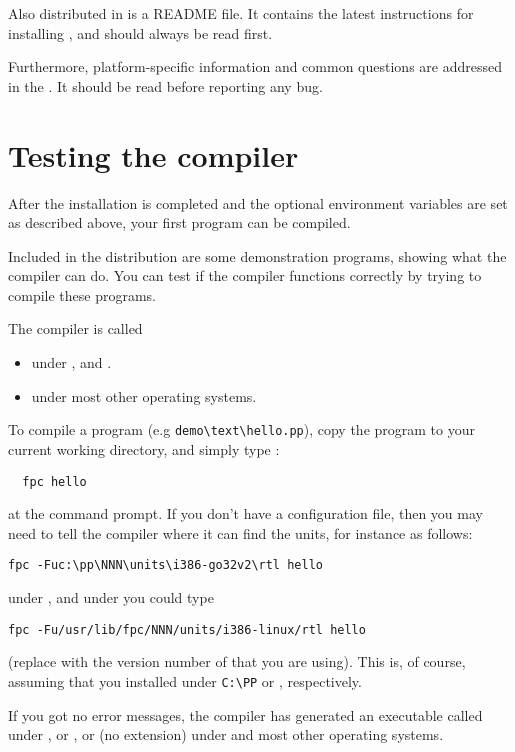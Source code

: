 Also distributed in \fpc is a README file. It contains the latest
instructions for installing \fpc, and should always be read first.

Furthermore, platform-specific information and common questions
are addressed in the . It should be read before reporting any 
bug.


\section{Testing the compiler}

After the installation is completed and the optional environment variables 
are set as described above, your first program can be compiled.

Included in the \fpc distribution are some demonstration programs,
showing what the compiler can do.
You can test if the compiler functions correctly by trying to compile
these programs.

The compiler is called
\begin{itemize}
\item {} under \windows, \ostwo and \dos.
\item {} under most other operating systems.
\end{itemize}
To compile a program (e.g \verb|demo\text\hello.pp|), copy the program
to your current working directory, and simply type :
\begin{verbatim}
  fpc hello
\end{verbatim}
at the command prompt. If you don't have a configuration file, then you may
need to tell the compiler where it can find the units, for instance as
follows:
\begin{verbatim}
fpc -Fuc:\pp\NNN\units\i386-go32v2\rtl hello
\end{verbatim}
under \dos, and under \linux you could type
\begin{verbatim}
fpc -Fu/usr/lib/fpc/NNN/units/i386-linux/rtl hello
\end{verbatim}
(replace  with the version number of \fpc that you are using).
This is, of course, assuming that you installed under \verb|C:\PP| or
, respectively.

If you got no error messages, the compiler has generated an executable
called  under \dos, \ostwo or \windows, or  
(no extension) under \unix and most other operating systems.

